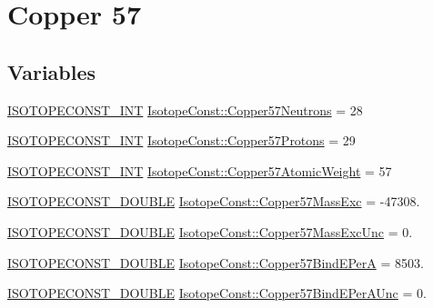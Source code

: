 \hypertarget{group___isotope_const-_copper-_cu57}{}\section{Copper 57}
\label{group___isotope_const-_copper-_cu57}
\subsection*{Variables}
\begin{DoxyCompactItemize}
\item 
\mbox{\hyperlink{group___isotope_const-_macros_ga5f18360b3e99483a35c32d789e62621c}{I\+S\+O\+T\+O\+P\+E\+C\+O\+N\+S\+T\+\_\+\+I\+NT}} \mbox{\hyperlink{group___isotope_const-_copper-_cu57_gaed57b640c31c1c8d2eccb4aaa1f17a51}{Isotope\+Const\+::\+Copper57\+Neutrons}} = 28
\item 
\mbox{\hyperlink{group___isotope_const-_macros_ga5f18360b3e99483a35c32d789e62621c}{I\+S\+O\+T\+O\+P\+E\+C\+O\+N\+S\+T\+\_\+\+I\+NT}} \mbox{\hyperlink{group___isotope_const-_copper-_cu57_gaebebfe4b86b98b426e4257717f9cb1a7}{Isotope\+Const\+::\+Copper57\+Protons}} = 29
\item 
\mbox{\hyperlink{group___isotope_const-_macros_ga5f18360b3e99483a35c32d789e62621c}{I\+S\+O\+T\+O\+P\+E\+C\+O\+N\+S\+T\+\_\+\+I\+NT}} \mbox{\hyperlink{group___isotope_const-_copper-_cu57_ga404571e1951fa45e4c5f4a4f97b79bee}{Isotope\+Const\+::\+Copper57\+Atomic\+Weight}} = 57
\item 
\mbox{\hyperlink{group___isotope_const-_macros_ga8f45a7272ce02c0b4c65c44636ed719a}{I\+S\+O\+T\+O\+P\+E\+C\+O\+N\+S\+T\+\_\+\+D\+O\+U\+B\+LE}} \mbox{\hyperlink{group___isotope_const-_copper-_cu57_ga2e926b949fa8854d1a3871e2b3c267ba}{Isotope\+Const\+::\+Copper57\+Mass\+Exc}} = -\/47308.
\item 
\mbox{\hyperlink{group___isotope_const-_macros_ga8f45a7272ce02c0b4c65c44636ed719a}{I\+S\+O\+T\+O\+P\+E\+C\+O\+N\+S\+T\+\_\+\+D\+O\+U\+B\+LE}} \mbox{\hyperlink{group___isotope_const-_copper-_cu57_gacaaf8e89f376b092c762923596f4d8b1}{Isotope\+Const\+::\+Copper57\+Mass\+Exc\+Unc}} = 0.
\item 
\mbox{\hyperlink{group___isotope_const-_macros_ga8f45a7272ce02c0b4c65c44636ed719a}{I\+S\+O\+T\+O\+P\+E\+C\+O\+N\+S\+T\+\_\+\+D\+O\+U\+B\+LE}} \mbox{\hyperlink{group___isotope_const-_copper-_cu57_gab14120593a288dc566cf936b29a5cf2d}{Isotope\+Const\+::\+Copper57\+Bind\+E\+PerA}} = 8503.
\item 
\mbox{\hyperlink{group___isotope_const-_macros_ga8f45a7272ce02c0b4c65c44636ed719a}{I\+S\+O\+T\+O\+P\+E\+C\+O\+N\+S\+T\+\_\+\+D\+O\+U\+B\+LE}} \mbox{\hyperlink{group___isotope_const-_copper-_cu57_ga33245aefefe685427bd296c883bf00f5}{Isotope\+Const\+::\+Copper57\+Bind\+E\+Per\+A\+Unc}} = 0.

\end{DoxyCompactItemize}
